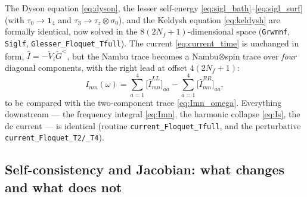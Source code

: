 \documentclass[11pt,a4paper]{article}
\newcommand{\id}{\mathbf{1}}          %
\begin{document}
The Dyson equation \eqref{eq:dyson}, the lesser self-energy
\eqref{eq:sigl_bath}--\eqref{eq:sigl_surf} (with $\tau_0\!\to\!\id_4$ and
$\tau_3\!\to\!\tau_z\otimes\sigma_0$), and the Keldysh equation \eqref{eq:keldysh}
are formally identical, now solved in the $8(2N_f+1)$-dimensional space
(\texttt{Grwmnf}, \texttt{Siglf}, \texttt{Glesser\_Floquet\_Tfull}).  The current
\eqref{eq:current_time} is unchanged in form, $\hat I=-\check V_i\check G^<$, but
the Nambu trace becomes a Nambu$\otimes$spin trace over \emph{four} diagonal
components, with the right lead at offset $4(2N_f+1)$:
\begin{equation}
  I_{mn}(\omega)
  = \sum_{a=1}^{4}\big[\hat I^{LL}_{mn}\big]_{aa}
  - \sum_{a=1}^{4}\big[\hat I^{RR}_{mn}\big]_{aa},
  \label{eq:Imn_4x4}
\end{equation}
to be compared with the two-component trace \eqref{eq:Imn_omega}.  Everything
downstream --- the frequency integral \eqref{eq:Imn}, the harmonic collapse
\eqref{eq:Is}, the dc current --- is identical (routine
\texttt{current\_Floquet\_Tfull}, and the perturbative
\texttt{current\_Floquet\_T2/\_T4}).

\subsection{Self-consistency and Jacobian: what changes and what does not}
\label{sec:ysr_jac}
\end{document}
